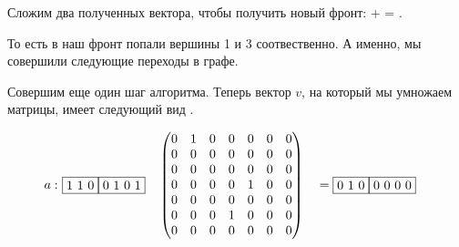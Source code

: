 \begin{example}
Сложим два полученных вектора, чтобы получить новый фронт:   +   =  .

То есть в наш фронт  попали вершины 1 и 3 соотвественно. А именно, мы совершили следующие переходы в графе.

\begin{center}
  \label{input_rpq}
\end{center}
  
Совершим еще один шаг алгоритма. Теперь вектор $v$, на который мы умножаем матрицы, имеет следующий вид  .

\begin{alignat*}{7}
  a:\,\,
  & \begin{matrix}
    \fbox{1 1 0} \fbox{0 1 0 1}
    \end{matrix}  && \begin{pmatrix}
      0 & 1 & 0 & 0 & 0 & 0 & 0 \\
      0 & 0 & 0 & 0 & 0 & 0 & 0 \\
      0 & 0 & 0 & 0 & 0 & 0 & 0 \\
      0 & 0 & 0 & 0 & 1 & 0 & 0 \\
      0 & 0 & 0 & 0 & 0 & 0 & 0 \\
      0 & 0 & 0 & 1 & 0 & 0 & 0 \\
      0 & 0 & 0 & 0 & 0 & 0 & 0  
      \end{pmatrix} &&= \begin{matrix}
        \fbox{0 1 0} \fbox{0 0 0 0} 
    \end{matrix}
\end{alignat*}


\end{example}
